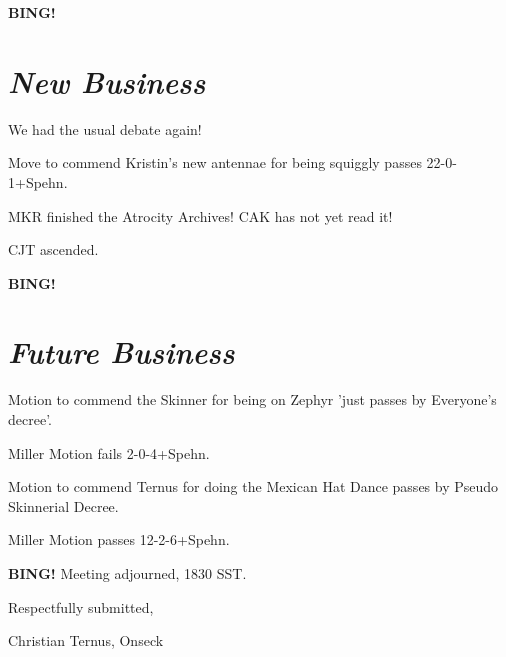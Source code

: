 \documentclass[10pt]{article}
\newcommand{\bing}{{\bf BING!} }
\newcommand{\goto}[1]{\bing \vskip 12pt \section*{{\em{#1}}}}
\begin{document}
\goto{New Business}

We had the usual debate again!

Move to commend Kristin's new antennae for being squiggly passes 22-0-1+Spehn.

MKR finished the Atrocity Archives!  CAK has not yet read it!

CJT ascended.

\goto{Future Business}

Motion to commend the Skinner for being on Zephyr 'just passes by Everyone's decree'.

Miller Motion fails 2-0-4+Spehn.

Motion to commend Ternus for doing the Mexican Hat Dance passes by Pseudo Skinnerial Decree.

Miller Motion passes 12-2-6+Spehn.

\bing
\noindent
Meeting adjourned, 1830 SST.

\vspace{18pt}

\centerline{Respectfully submitted,}
\centerline{Christian Ternus, Onseck}
\end{document}
